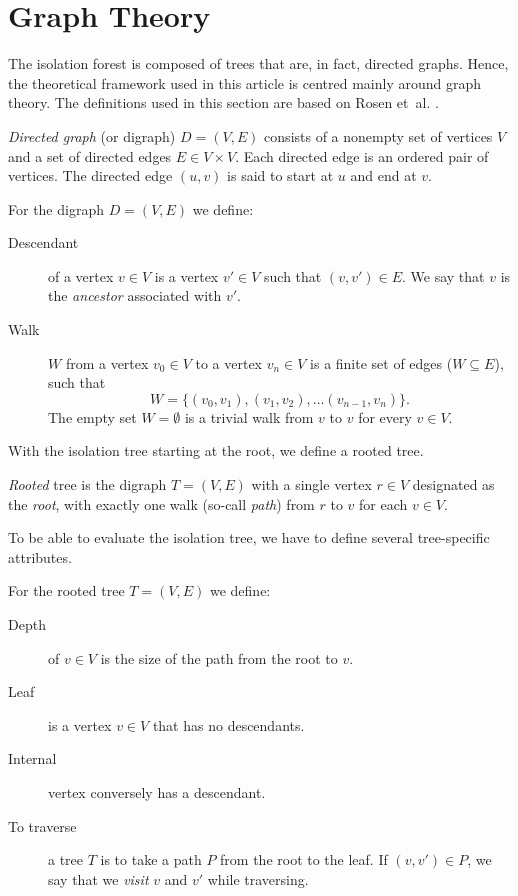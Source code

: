 \section{Graph Theory}
\label{sec:graph_theory}

 The isolation forest is composed of trees that are, in fact, directed graphs.
 Hence, the theoretical framework used in this article is centred mainly around graph theory.
 The definitions used in this section are based on Rosen et~al. \cite{rosen2012discrete}. 


\begin{definition}
 \emph{Directed graph} (or digraph) $D = (V, E)$ consists of a nonempty set of vertices $V$ and a set of directed edges $E \in V \times V$.
 Each directed edge is an ordered pair of vertices.
 The directed edge $(u, v)$ is said to start at $u$ and end at $v$.
\end{definition}


 For the digraph $D = (V,E)$ we define:
\begin{description}
    \item[Descendant] of a vertex $v \in V$ is a vertex $v' \in V$ such that $(v,v') \in E$. 
    We say that $v$ is the \emph{ancestor} associated with $v'$.
    \item[Walk] $W$ from a vertex $v_0 \in V$ to a vertex $v_n \in V$ is a finite set of edges ($W \subseteq E$), such that $$W = \{(v_0, v_1),(v_1, v_2),\dots(v_{n-1}, v_n)\}.$$
    The empty set $W = \emptyset$ is a trivial walk from $v$ to $v$ for every $v \in V$. 
\end{description}

With the isolation tree starting at the root, we define a rooted tree.

\begin{definition}
\emph{Rooted} tree is the digraph $T = (V,E)$ with a single vertex $r \in V$ designated as the \emph{root}, with exactly one walk (so-call \emph{path}) from $r$ to $v$ for each $v \in V$.
\end{definition}

To be able to evaluate the isolation tree, we have to define several tree-specific attributes.

For the rooted tree $T = (V,E)$ we define:
\begin{description}
    \item[Depth] of $v \in V$ is the size of the path from the root to $v$.
    \item[Leaf] is a vertex $v \in V$ that has no descendants. 
    \item[Internal] vertex conversely has a descendant.
    \item[To traverse] a tree $T$ is to take a path $P$ from the root to the leaf. If $(v,v') \in P$, we say that we \emph{visit} $v$ and $v'$ while traversing.
\end{description}
